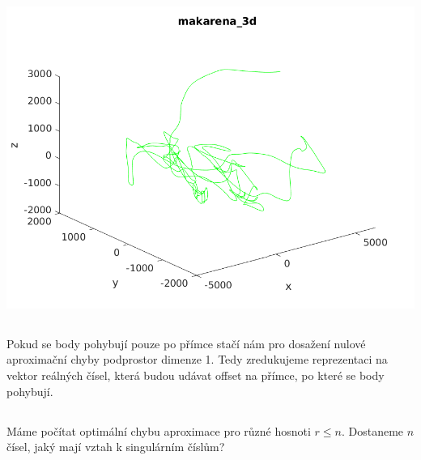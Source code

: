 \documentclass[10pt,a4paper,openright]{article}
\begin{document}
\includegraphics[scale=0.5]{makarena_3d.png}\\

\subsection{}
Pokud se body pohybují pouze po přímce stačí nám pro dosažení nulové aproximační chyby podprostor dimenze 1.
Tedy zredukujeme reprezentaci na vektor reálných čísel, která budou udávat offset na přímce, po které se body pohybují.

\subsection{}
Máme počítat optimální chybu aproximace pro různé hosnoti $r \leq n$.
Dostaneme $n$ čísel, jaký mají vztah k singulárním číslům?
\end{document}
